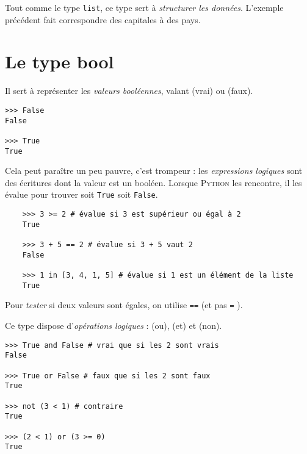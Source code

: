 Tout comme le type \texttt{list}, ce type sert à \textit{structurer les données}. L'exemple précédent fait correspondre des capitales à des pays.



\section{Le type bool}
Il sert à représenter les \textit{valeurs booléennes}, valant  (vrai) ou
 (faux).

\begin{pys}\begin{verbatim}
>>> False
False

>>> True
True
\end{verbatim}
\end{pys}

Cela peut paraître un peu pauvre, c'est trompeur : les \textit{expressions logiques} sont des écritures dont la valeur est un booléen. Lorsque \textsc{Python} les rencontre, il les évalue pour trouver soit \texttt{True} soit \texttt{False}.

\begin{pyc}
  \begin{verbatim}
    >>> 3 >= 2 # évalue si 3 est supérieur ou égal à 2
    True
    
    >>> 3 + 5 == 2 # évalue si 3 + 5 vaut 2
    False

    >>> 1 in [3, 4, 1, 5] # évalue si 1 est un élément de la liste
    True
  \end{verbatim}
\end{pyc}

\begin{remarque}[]
  Pour \textit{tester} si deux valeurs sont égales, on utilise \texttt{==}  (et pas \texttt{=} ).
\end{remarque}

Ce type dispose d'\textit{opérations logiques} :  (ou),  (et) et  (non).

\begin{pyc}\begin{verbatim}
>>> True and False # vrai que si les 2 sont vrais
False

>>> True or False # faux que si les 2 sont faux
True

>>> not (3 < 1) # contraire
True

>>> (2 < 1) or (3 >= 0)
True
\end{verbatim}
\end{pyc}